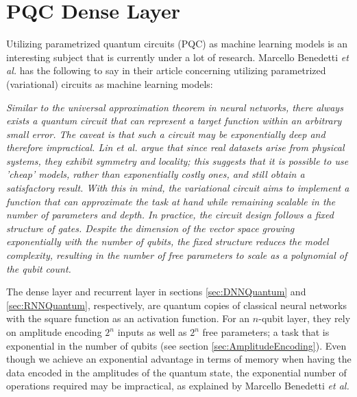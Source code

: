 \section{PQC Dense Layer}
\label{sec:GeneralLayer}
Utilizing parametrized quantum circuits (PQC) as machine learning models is an interesting subject that is currently under a lot of research. Marcello Benedetti \textit{et al.} \cite{PQC} has the following to say in their article concerning utilizing parametrized (variational) circuits as machine learning models: 

\textit{Similar to the universal approximation theorem in neural networks, there always exists a quantum circuit that can represent a target function within an arbitrary small error. The caveat is that such a circuit may be exponentially deep and therefore impractical. Lin et al. \cite{linetal} argue that since real datasets arise from physical systems, they exhibit symmetry and locality; this suggests that it is possible to use 'cheap' models, rather than exponentially costly ones, and still obtain a satisfactory result. With this in mind, the variational circuit aims to implement a function that can approximate the task at hand while remaining scalable in the number of parameters and depth.
In practice, the circuit design follows a fixed structure of gates. Despite the dimension of the vector space growing exponentially with the number of qubits, the fixed structure reduces the model complexity, resulting in the number of free parameters to scale as a polynomial of the qubit count.}

The dense layer and recurrent layer in sections \ref{sec:DNNQuantum} and \ref{sec:RNNQuantum}, respectively, are quantum copies of classical neural networks with the square function as an activation function. For an $n$-qubit layer, they rely on amplitude encoding $2^n$ inputs as well as $2^n$ free parameters; a task that is exponential in the number of qubits (see section \ref{sec:AmplitudeEncoding}). Even though we achieve an exponential advantage in terms of memory when having the data encoded in the amplitudes of the quantum state, the exponential number of operations required may be impractical, as explained by Marcello Benedetti \textit{et al.}

